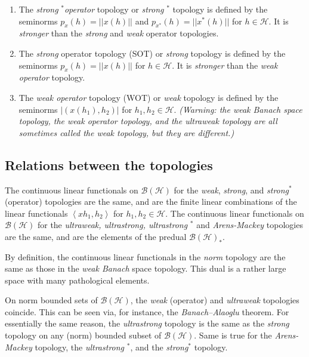 \documentclass[aps,preprint]{revtex4}%
\begin{document}
\begin{enumerate}
\item The \emph{strong }$^{\ast}$\emph{operator} topology or \emph{strong
}$^{\ast}$ topology is defined by the seminorms $p_{x}\left(  h\right)
=||x(h)||$ and $p_{x^{\ast}}\left(  h\right)  =||x^{\ast}(h)||$ for
$h\in\mathcal{H}$. It is \emph{stronger} than the \emph{strong} and
\emph{weak} operator topologies.

\item The \emph{strong} operator topology (SOT) or \emph{strong} topology is
defined by the seminorms $p_{x}\left(  h\right)  =||x(h)||$ for $h\in
\mathcal{H}$. It is \emph{stronger} than the \emph{weak operator} topology.

\item The \emph{weak operator} topology (WOT) or \emph{weak} topology is
defined by the seminorms $|(x(h_{1}),h_{2})|$ for $h_{1},h_{2}\in\mathcal{H}$.
\emph{(Warning: the weak Banach space topology, the weak operator topology,
and the ultraweak topology are all sometimes called the weak topology, but
they are different.)}
\end{enumerate}

\subsection{Relations between the topologies}

The continuous linear functionals on $\mathcal{B}(\mathcal{H})$ for the
\emph{weak}, \emph{strong}, and \emph{strong}$^{\ast}$ (operator) topologies
are the same, and are the finite linear combinations of the linear functionals
$\left\langle xh_{1},h_{2}\right\rangle $ for $h_{1},h_{2}\in\mathcal{H}$. The
continuous linear functionals on $\mathcal{B}(\mathcal{H})$ for the
\emph{ultraweak, ultrastrong, ultrastrong} $^{\ast}$ and \emph{Arens-Mackey}
topologies are the same, and are the elements of the predual $\mathcal{B}%
(\mathcal{H})_{\ast}$.

By definition, the continuous linear functionals in the \emph{norm} topology
are the same as those in the \emph{weak Banach} space topology. This dual is a
rather large space with many pathological elements.

On norm bounded sets of $\mathcal{B}(\mathcal{H})$, the \emph{weak} (operator)
and \emph{ultraweak} topologies coincide. This can be seen via, for instance,
the \emph{Banach--Alaoglu} theorem. For essentially the same reason, the
\emph{ultrastrong} topology is the same as the \emph{strong} topology on any
(norm) bounded subset of $\mathcal{B}(\mathcal{H})$. Same is true for the
\emph{Arens-Mackey} topology, the \emph{ultrastrong} $^{\ast}$, and the
\emph{strong}$^{\ast}$ topology.
\end{document}
